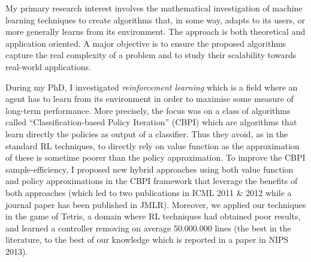 My primary research interest involves the mathematical investigation of machine learning techniques to create algorithms that, in some way, adapts to its users, or more generally learns from its environment. The approach is both theoretical and application oriented. A major objective is to ensure the proposed algorithms capture the real complexity of a problem and to study  their scalability towards real-world applications. 

During my PhD, I investigated \textit{reinforcement learning}  which is a field where an agent has to learn from its environment in order to maximise some measure of long-term performance. More precisely, the focus was on a class of algorithms called ``Classification-based Policy Iteration'' (CBPI) which are algorithms that learn directly the policies as output of a classifier. Thus they avoid, as in the standard RL techniques, to directly rely on  value function as the approximation of these is sometime poorer than the policy approximation. To improve the CBPI sample-efficiency, I proposed new hybrid approaches using both value function and policy approximations in the CBPI framework that leverage the benefits of both approaches (which led to two publications in ICML 2011 \& 2012 while a journal paper has been published in JMLR). Moreover, we applied our techniques in the game of Tetris, a domain where RL techniques had obtained poor results, and learned a controller removing on average 50.000.000 lines (the best in the literature, to the best of our knowledge which is reported in a paper in NIPS 2013).

